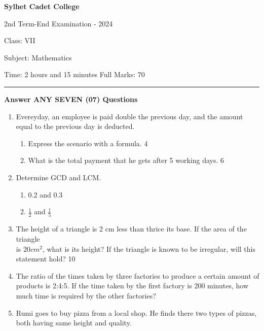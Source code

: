 \documentclass{exam}
\begin{document}
\begin{center}
  \bfseries\large
  Sylhet Cadet College

\normalsize
2nd Term-End Examination - 2024

  Class: VII
  
  Subject: Mathematics

  Time: 2 hours and 15 minutes \qquad \qquad  \qquad \qquad \qquad  \qquad \qquad  \qquad Full Marks: 70 
  
  \noindent\rule{16cm}{0.4pt}
  
  \textbf{Answer ANY SEVEN (07) Questions}
  
  \begin{enumerate}
  
  \item Evereyday, an employee is paid double the previous day, and the amount 
  equal to the previous day is deducted. 
  
  \begin{enumerate}

    \item Express the scenario with a formula. \hfill 4
    \item What is the total payment that he gets after 5 working days. \hfill 6

\end{enumerate}

\item Determine GCD and LCM.

\begin{enumerate}

\item 0.2 and 0.3
\item $\frac 12$ and $\frac 15$

\end{enumerate}


  
  \item The height of a triangle is 2 cm less than thrice its base. If the area
  of the triangle \\ is $20 cm^2$, what is its height? If the triangle is known
  to be irregular, will this statement hold? \hfill 10
  
  \item The ratio of the times taken by three factories to produce a certain amount
  of products is 2:4:5. If the time taken by the first factory is 200 minutes, 
  how much time is required by the other factories? 
  
  \item Rumi goes to buy pizza from a local shop. He finds there two types of
  pizzas, both having same height and quality. 
  

\end{enumerate}
\end{center}
\end{document}
